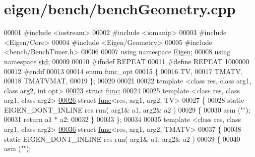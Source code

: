 \hypertarget{eigen_2bench_2bench_geometry_8cpp_source}{}\section{eigen/bench/bench\+Geometry.cpp}
\label{eigen_2bench_2bench_geometry_8cpp_source}

\begin{DoxyCode}
00001 \textcolor{preprocessor}{#include <iostream>}
00002 \textcolor{preprocessor}{#include <iomanip>}
00003 \textcolor{preprocessor}{#include <Eigen/Core>}
00004 \textcolor{preprocessor}{#include <Eigen/Geometry>}
00005 \textcolor{preprocessor}{#include <bench/BenchTimer.h>}
00006 
00007 \textcolor{keyword}{using namespace }\hyperlink{namespace_eigen}{Eigen};
00008 \textcolor{keyword}{using namespace }\hyperlink{namespacestd}{std};
00009 
00010 \textcolor{preprocessor}{#ifndef REPEAT}
00011 \textcolor{preprocessor}{#define REPEAT 1000000}
00012 \textcolor{preprocessor}{#endif}
00013 
00014 \textcolor{keyword}{enum} func\_opt
00015 \{
00016     TV,
00017     TMATV,
00018     TMATVMAT,
00019 \};
00020 
00021 
00022 \textcolor{keyword}{template} <\textcolor{keyword}{class} res, \textcolor{keyword}{class} arg1, \textcolor{keyword}{class} arg2, \textcolor{keywordtype}{int} opt>
\hyperlink{structfunc}{00023} \textcolor{keyword}{struct }\hyperlink{structfunc}{func};
00024 
00025 \textcolor{keyword}{template} <\textcolor{keyword}{class} res, \textcolor{keyword}{class} arg1, \textcolor{keyword}{class} arg2>
\hyperlink{structfunc_3_01res_00_01arg1_00_01arg2_00_01_t_v_01_4}{00026} \textcolor{keyword}{struct }\hyperlink{structfunc}{func}<res, arg1, arg2, TV>
00027 \{
00028     \textcolor{keyword}{static} EIGEN\_DONT\_INLINE res run( arg1& a1, arg2& a2 )
00029     \{
00030     \textcolor{keyword}{asm} (\textcolor{stringliteral}{""});
00031     \textcolor{keywordflow}{return} a1 * a2;
00032     \}
00033 \};
00034 
00035 \textcolor{keyword}{template} <\textcolor{keyword}{class} res, \textcolor{keyword}{class} arg1, \textcolor{keyword}{class} arg2>
\hyperlink{structfunc_3_01res_00_01arg1_00_01arg2_00_01_t_m_a_t_v_01_4}{00036} \textcolor{keyword}{struct }\hyperlink{structfunc}{func}<res, arg1, arg2, TMATV>
00037 \{
00038     \textcolor{keyword}{static} EIGEN\_DONT\_INLINE res run( arg1& a1, arg2& a2 )
00039     \{
00040     \textcolor{keyword}{asm} (\textcolor{stringliteral}{""});

\end{DoxyCode}
